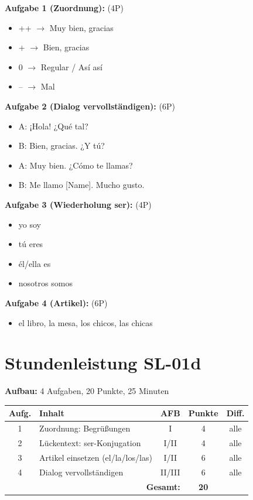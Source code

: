 \documentclass[11pt,a4paper]{article}
\begin{document}
\textbf{Aufgabe 1 (Zuordnung):} (4P)
\begin{itemize}
    \item ++ $\rightarrow$ Muy bien, gracias
    \item + $\rightarrow$ Bien, gracias
    \item 0 $\rightarrow$ Regular / Así así
    \item -- $\rightarrow$ Mal
\end{itemize}

\textbf{Aufgabe 2 (Dialog vervollständigen):} (6P)
\begin{itemize}
    \item A: ¡Hola! ¿Qué tal?
    \item B: Bien, gracias. ¿Y tú?
    \item A: Muy bien. ¿Cómo te llamas?
    \item B: Me llamo [Name]. Mucho gusto.
\end{itemize}

\textbf{Aufgabe 3 (Wiederholung ser):} (4P)
\begin{itemize}
    \item yo soy
    \item tú eres
    \item él/ella es
    \item nosotros somos
\end{itemize}

\textbf{Aufgabe 4 (Artikel):} (6P)
\begin{itemize}
    \item el libro, la mesa, los chicos, las chicas
\end{itemize}

\section{Stundenleistung SL-01d}

\textbf{Aufbau:} 4 Aufgaben, 20 Punkte, 25 Minuten

\begin{tabular}{|c|l|c|c|c|}
\hline
\textbf{Aufg.} & \textbf{Inhalt} & \textbf{AFB} & \textbf{Punkte} & \textbf{Diff.} \\
\hline
1 & Zuordnung: Begrüßungen & I & 4 & alle \\
\hline
2 & Lückentext: ser-Konjugation & I/II & 4 & alle \\
\hline
3 & Artikel einsetzen (el/la/los/las) & I/II & 6 & alle \\
\hline
4 & Dialog vervollständigen & II/III & 6 & alle \\
\hline
\multicolumn{3}{|r|}{\textbf{Gesamt:}} & \textbf{20} & \\
\hline
\end{tabular}
\end{document}
